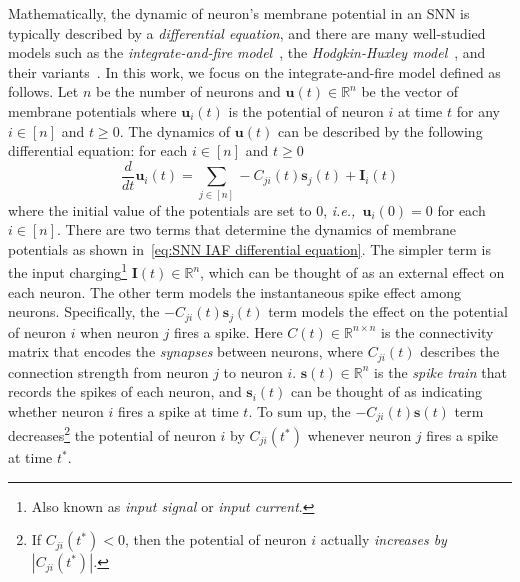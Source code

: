 \documentclass[11pt]{article}
\theoremstyle{remark}
\theoremstyle{definition}
\newcommand{\bI}{\mathbf{I}}
\newcommand{\bu}{\mathbf{u}}
\newcommand{\bs}{\mathbf{s}}
\newcommand{\ie} {{\it i.e.,\ }}
\newcommand{\R}{{\mathbb R}} %
\begin{document}
Mathematically, the dynamic of neuron's membrane potential in an SNN is typically described by a \textit{differential equation}, and there are many well-studied models such as the \textit{integrate-and-fire model}~\cite{lapicque1907recherches}, the \textit{Hodgkin-Huxley model}~\cite{hodgkin1952quantitative}, and their variants~\cite{fitzhugh1961impulses,stein1965theoretical,morris1981voltage,hindmarsh1984model,gerstner1995time,kistler1997reduction,brunel2003firing,fourcaud2003spike,izhikevich2003simple,teka2014neuronal}. 
%
In this work, we focus on the integrate-and-fire model defined as follows.
Let $n$ be the number of neurons and $\bu(t)\in\R^n$ be the vector of membrane potentials where $\bu_i(t)$ is the potential of neuron $i$ at time $t$ for any $i\in[n]$ and $t\geq0$. The dynamics of $\bu(t)$ can be described by the following differential equation: for each $i\in[n]$ and $t\geq0$
\begin{equation}\label{eq:SNN IAF differential equation}
\frac{d}{dt}\bu_i(t) = \sum_{j\in[n]}-C_{ji}(t)\bs_j(t) + \bI_i(t)
\end{equation}
where the initial value of the potentials are set to 0, \ie $\bu_i(0)=0$ for each $i\in[n]$.
There are two terms that determine the dynamics of membrane potentials as shown in~\eqref{eq:SNN IAF differential equation}. The simpler term is the input charging\footnote{Also known as \textit{input signal} or \textit{input current}.} $\bI(t)\in\R^n$, which can be thought of as an external effect on each neuron. The other term models the instantaneous spike effect among neurons. Specifically, the $-C_{ji}(t)\bs_j(t)$ term models the effect on the potential of neuron $i$ when neuron $j$ fires a spike. Here $C(t)\in\R^{n\times n}$ is the connectivity matrix that encodes the \textit{synapses} between neurons, where $C_{ji}(t)$ describes the connection strength from neuron $j$ to neuron $i$. $\bs(t)\in\R^n$ is the \textit{spike train} that records the spikes of each neuron, and $\bs_i(t)$ can be thought of as indicating whether neuron $i$ fires a spike at time $t$. To sum up, the $-C_{ji}(t)\bs(t)$ term decreases\footnote{If $C_{ji}(t^*)<0$, then the potential of neuron $i$ actually \textit{increases by $|C_{ji}(t^*)|$.}} the potential of neuron $i$ by $C_{ji}(t^*)$ whenever neuron $j$ fires a spike at time $t^*$.
\end{document}
